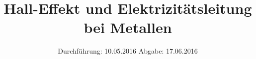 

\subject{V 311}
\title{Hall-Effekt und Elektrizitätsleitung bei Metallen}
\date{
  Durchführung: 10.05.2016
  \hspace{3em}
  Abgabe: 17.06.2016
}



\maketitle
\thispagestyle{empty}
\tableofcontents
\newpage







\printbibliography


